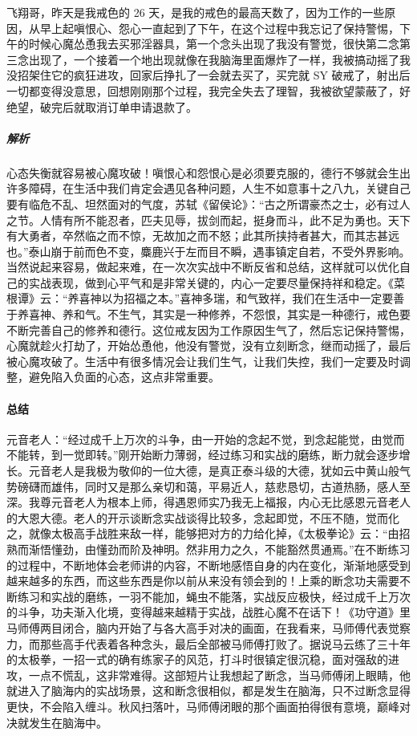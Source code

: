 \begin{case}
    飞翔哥，昨天是我戒色的 26 天，是我的戒色的最高天数了，因为工作的一些原因，从早上起嗔恨心、怨心一直起到了下午，在这个过程中我忘记了保持警惕，下午的时候心魔怂恿我去买邪淫器具，第一个念头出现了我没有警觉，很快第二念第三念出现了，一个接着一个地出现就像在我脑海里面爆炸了一样，我被搞动摇了我没招架住它的疯狂进攻，回家后挣扎了一会就去买了，买完就 SY 破戒了，射出后一切都变得没意思，回想刚刚那个过程，我完全失去了理智，我被欲望蒙蔽了，好绝望，破完后就取消订单申请退款了。
    \subparagraph{解析} 心态失衡就容易被心魔攻破！嗔恨心和怨恨心是必须要克服的，德行不够就会生出许多障碍，在生活中我们肯定会遇见各种问题，人生不如意事十之八九，关键自己要有临危不乱、坦然面对的气度，苏轼《留侯论》：“古之所谓豪杰之士，必有过人之节。人情有所不能忍者，匹夫见辱，拔剑而起，挺身而斗，此不足为勇也。天下有大勇者，卒然临之而不惊，无故加之而不怒；此其所挟持者甚大，而其志甚远也。”泰山崩于前而色不变，麋鹿兴于左而目不瞬，遇事镇定自若，不受外界影响。当然说起来容易，做起来难，在一次次实战中不断反省和总结，这样就可以优化自己的实战表现，做到心平气和是非常关键的，内心一定要尽量保持祥和稳定。《菜根谭》云：“养喜神以为招福之本。”喜神多瑞，和气致祥，我们在生活中一定要善于养喜神、养和气。不生气，其实是一种修养，不怨恨，其实是一种德行，戒色要不断完善自己的修养和德行。这位戒友因为工作原因生气了，然后忘记保持警惕，心魔就趁火打劫了，开始怂恿他，他没有警觉，没有立刻断念，继而动摇了，最后被心魔攻破了。生活中有很多情况会让我们生气，让我们失控，我们一定要及时调整，避免陷入负面的心态，这点非常重要。
\end{case}

\paragraph{总结}

元音老人：“经过成千上万次的斗争，由一开始的念起不觉，到念起能觉，由觉而不能转，到一觉即转。”刚开始断力薄弱，经过练习和实战的磨练，断力就会逐步增长。元音老人是我极为敬仰的一位大德，是真正泰斗级的大德，犹如云中黄山般气势磅礴而雄伟，同时又是那么亲切和蔼，平易近人，慈悲恳切，古道热肠，感人至深。我尊元音老人为根本上师，得遇恩师实乃我无上福报，内心无比感恩元音老人的大恩大德。老人的开示谈断念实战谈得比较多，念起即觉，不压不随，觉而化之，就像太极高手战胜来敌一样，能够把对方的力给化掉，《太极拳论》云：“由招熟而渐悟懂劲，由懂劲而阶及神明。然非用力之久，不能豁然贯通焉。”在不断练习的过程中，不断地体会老师讲的内容，不断地感悟自身的内在变化，渐渐地感受到越来越多的东西，而这些东西是你以前从来没有领会到的！上乘的断念功夫需要不断练习和实战的磨练，一羽不能加，蝇虫不能落，实战反应极快，经过成千上万次的斗争，功夫渐入化境，变得越来越精于实战，战胜心魔不在话下！《功守道》里马师傅两目闭合，脑内开始了与各大高手对决的画面，在我看来，马师傅代表觉察力，而那些高手代表着各种念头，最后全部被马师傅打败了。据说马云练了三十年的太极拳，一招一式的确有练家子的风范，打斗时很镇定很沉稳，面对强敌的进攻，一点不慌乱，这非常难得。这部短片让我想起了断念，当马师傅闭上眼睛，他就进入了脑海内的实战场景，这和断念很相似，都是发生在脑海，只不过断念显得更快，不会陷入缠斗。秋风扫落叶，马师傅闭眼的那个画面拍得很有意境，巅峰对决就发生在脑海中。

